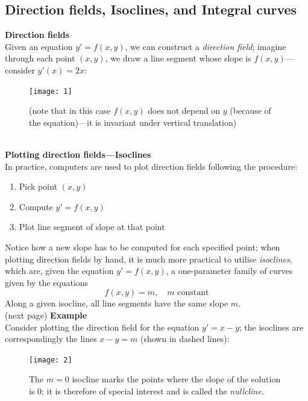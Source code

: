 \documentclass{report}
\begin{document}
\subsection{Direction fields, Isoclines, and Integral curves}%
\textbf{Direction fields}\\
Given an equation $y'=f(x,y)$, we can construct a \textit{direction field}; imagine through each point $(x,y)$, we
draw a line segment whose slope is $f(x,y)$---consider $y'(x)=2x$:
\begin{figure}[h]
\begin{center}
\texttt{[image: 1]}\\
\end{center}
(note that in this case $f(x,y)$ does not depend on $y$ (because of the equation)---it is invariant under vertical
translation)
\end{figure}\\
\textbf{Plotting direction fields---Isoclines}\\
In practice, computers are used to plot direction fields following the procedure:
\begin{enumerate}
\item Pick point $(x,y)$
\item Compute $y'=f(x,y)$
\item Plot line segment of slope at that point
\end{enumerate}
Notice how a new slope has to be computed for each specified point; when plotting direction fields by hand, 
it is much more practical to utilise \textit{isoclines}, which are, given the equation $y'=f(x,y)$, a one-parameter
family of curves given by the equations
\begin{equation*}
f(x,y)=m,\quad m\text{ constant}
\end{equation*}
Along a given isocline, all line segments have the same slope $m$.\\
(next page)
\newpage
\noindent\textbf{Example}\\
Consider plotting the direction field for the equation
$y'=x-y$; the isoclines are correspondingly the lines
$x-y=m$ (shown in dashed lines):
\begin{figure}[h]
\begin{center}
\texttt{[image: 2]}\\
\end{center}
The $m=0$ isocline marks the points where the slope of the solution is 0; it is therefore of special interest 
and is called the \textit{nullcline}.
\end{figure}\\
\end{document}
